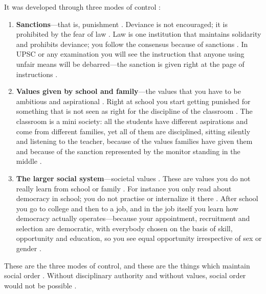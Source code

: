It was developed through three modes of control :
\begin{enumerate}
    \item \textbf{Sanctions}---that is, punishment . Deviance is not encouraged; it is prohibited by the fear of law . Law is one institution that maintains solidarity and prohibits deviance; you follow the consensus because of sanctions . In UPSC or any examination you will see the instruction that anyone using unfair means will be debarred---the sanction is given right at the page of instructions .
    \item \textbf{Values given by school and family}---the values that you have to be ambitious and aspirational . Right at school you start getting punished for something that is not seen as right for the discipline of the classroom . The classroom is a mini society: all the students have different aspirations and come from different families, yet all of them are disciplined, sitting silently and listening to the teacher, because of the values families have given them and because of the sanction represented by the monitor standing in the middle .
    \item \textbf{The larger social system}---societal values . These are values you do not really learn from school or family . For instance you only read about democracy in school; you do not practise or internalize it there . After school you go to college and then to a job, and in the job itself you learn how democracy actually operates---because your appointment, recruitment and selection are democratic, with everybody chosen on the basis of skill, opportunity and education, so you see equal opportunity irrespective of sex or gender .
\end{enumerate}

\begin{KeyConcept}
These are the three modes of control, and these are the things which maintain social order . Without disciplinary authority and without values, social order would not be possible .
\end{KeyConcept}

